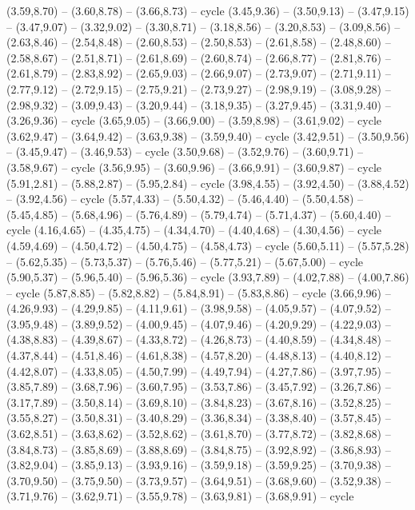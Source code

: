 \providecommand\Land[1]{\csname geo:Land:#1\endcsname}
\def\LandListe{heute}
\expandafter\def\csname geo:Land:heute\endcsname{
  (3.59,8.70) -- (3.60,8.78) -- (3.66,8.73) -- cycle
  (3.45,9.36) -- (3.50,9.13) -- (3.47,9.15) -- (3.47,9.07) -- (3.32,9.02) -- (3.30,8.71) -- (3.18,8.56) -- (3.20,8.53) -- (3.09,8.56) -- (2.63,8.46) -- (2.54,8.48) -- (2.60,8.53) -- (2.50,8.53) -- (2.61,8.58) -- (2.48,8.60) -- (2.58,8.67) -- (2.51,8.71) -- (2.61,8.69) -- (2.60,8.74) -- (2.66,8.77) -- (2.81,8.76) -- (2.61,8.79) -- (2.83,8.92) -- (2.65,9.03) -- (2.66,9.07) -- (2.73,9.07) -- (2.71,9.11) -- (2.77,9.12) -- (2.72,9.15) -- (2.75,9.21) -- (2.73,9.27) -- (2.98,9.19) -- (3.08,9.28) -- (2.98,9.32) -- (3.09,9.43) -- (3.20,9.44) -- (3.18,9.35) -- (3.27,9.45) -- (3.31,9.40) -- (3.26,9.36) -- cycle
  (3.65,9.05) -- (3.66,9.00) -- (3.59,8.98) -- (3.61,9.02) -- cycle
  (3.62,9.47) -- (3.64,9.42) -- (3.63,9.38) -- (3.59,9.40) -- cycle
  (3.42,9.51) -- (3.50,9.56) -- (3.45,9.47) -- (3.46,9.53) -- cycle
  (3.50,9.68) -- (3.52,9.76) -- (3.60,9.71) -- (3.58,9.67) -- cycle
  (3.56,9.95) -- (3.60,9.96) -- (3.66,9.91) -- (3.60,9.87) -- cycle
  (5.91,2.81) -- (5.88,2.87) -- (5.95,2.84) -- cycle
  (3.98,4.55) -- (3.92,4.50) -- (3.88,4.52) -- (3.92,4.56) -- cycle
  (5.57,4.33) -- (5.50,4.32) -- (5.46,4.40) -- (5.50,4.58) -- (5.45,4.85) -- (5.68,4.96) -- (5.76,4.89) -- (5.79,4.74) -- (5.71,4.37) -- (5.60,4.40) -- cycle
  (4.16,4.65) -- (4.35,4.75) -- (4.34,4.70) -- (4.40,4.68) -- (4.30,4.56) -- cycle
  (4.59,4.69) -- (4.50,4.72) -- (4.50,4.75) -- (4.58,4.73) -- cycle
  (5.60,5.11) -- (5.57,5.28) -- (5.62,5.35) -- (5.73,5.37) -- (5.76,5.46) -- (5.77,5.21) -- (5.67,5.00) -- cycle
  (5.90,5.37) -- (5.96,5.40) -- (5.96,5.36) -- cycle
  (3.93,7.89) -- (4.02,7.88) -- (4.00,7.86) -- cycle
  (5.87,8.85) -- (5.82,8.82) -- (5.84,8.91) -- (5.83,8.86) -- cycle
  (3.66,9.96) -- (4.26,9.93) -- (4.29,9.85) -- (4.11,9.61) -- (3.98,9.58) -- (4.05,9.57) -- (4.07,9.52) -- (3.95,9.48) -- (3.89,9.52) -- (4.00,9.45) -- (4.07,9.46) -- (4.20,9.29) -- (4.22,9.03) -- (4.38,8.83) -- (4.39,8.67) -- (4.33,8.72) -- (4.26,8.73) -- (4.40,8.59) -- (4.34,8.48) -- (4.37,8.44) -- (4.51,8.46) -- (4.61,8.38) -- (4.57,8.20) -- (4.48,8.13) -- (4.40,8.12) -- (4.42,8.07) -- (4.33,8.05) -- (4.50,7.99) -- (4.49,7.94) -- (4.27,7.86) -- (3.97,7.95) -- (3.85,7.89) -- (3.68,7.96) -- (3.60,7.95) -- (3.53,7.86) -- (3.45,7.92) -- (3.26,7.86) -- (3.17,7.89) -- (3.50,8.14) -- (3.69,8.10) -- (3.84,8.23) -- (3.67,8.16) -- (3.52,8.25) -- (3.55,8.27) -- (3.50,8.31) -- (3.40,8.29) -- (3.36,8.34) -- (3.38,8.40) -- (3.57,8.45) -- (3.62,8.51) -- (3.63,8.62) -- (3.52,8.62) -- (3.61,8.70) -- (3.77,8.72) -- (3.82,8.68) -- (3.84,8.73) -- (3.85,8.69) -- (3.88,8.69) -- (3.84,8.75) -- (3.92,8.92) -- (3.86,8.93) -- (3.82,9.04) -- (3.85,9.13) -- (3.93,9.16) -- (3.59,9.18) -- (3.59,9.25) -- (3.70,9.38) -- (3.70,9.50) -- (3.75,9.50) -- (3.73,9.57) -- (3.64,9.51) -- (3.68,9.60) -- (3.52,9.38) -- (3.71,9.76) -- (3.62,9.71) -- (3.55,9.78) -- (3.63,9.81) -- (3.68,9.91) -- cycle
}

